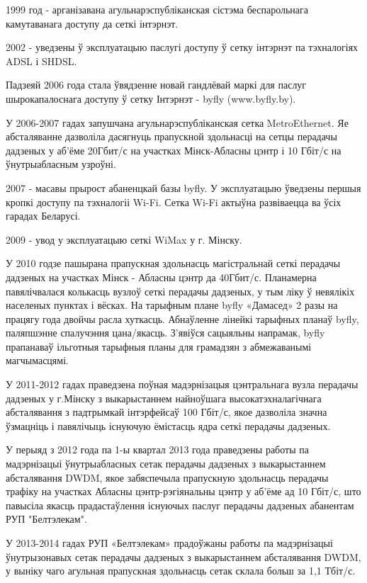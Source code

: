 1999 год - арганізавана агульнарэспубліканская сістэма беспарольнага камутаванага доступу да сеткі інтэрнэт.

2002 - уведзены ў эксплуатацыю паслугі доступу ў сетку інтэрнэт па тэхналогіях ADSL і SHDSL.

Падзеяй 2006 года стала ўвядзенне новай гандлёвай маркі для паслуг шырокапалоснага доступу ў сетку Інтэрнэт - byfly (www.byfly.by).

У 2006-2007 гадах запушчана агульнарэспубліканская сетка MetroEthernet. Яе абсталяванне дазволіла дасягнуць прапускной здольнасці на сетцы перадачы дадзеных у аб'ёме 20Гбит/с на участках Мінск-Абласны цэнтр і 10 Гбіт/с на ўнутрыабласным узроўні.

2007 - масавы прырост абаненцкай базы byfly. У эксплуатацыю ўведзены першыя кропкі доступу па тэхналогіі Wi-Fi. Сетка Wi-Fi актыўна развіваецца ва ўсіх гарадах Беларусі.

2009 - увод у эксплуатацыю сеткі WiMax у г. Мінску.

У 2010 годзе пашырана прапускная здольнасць магістральнай сеткі перадачы дадзеных на участках Мінск - Абласны цэнтр да 40Гбит/с. Планамерна павялічвалася колькасць вузлоў сеткі перадачы дадзеных, у тым ліку ў невялікіх населеных пунктах і вёсках. На тарыфным плане byfly «Дамасед» 2 разы на працягу года двойчы расла хуткасць. Абнаўленне лінейкі тарыфных планаў byfly, паляпшэнне спалучэння цана/якасць. З'явіўся сацыяльны напрамак, byfly прапанаваў ільготныя тарыфныя планы для грамадзян з абмежаванымі магчымасцямі.

У 2011-2012 гадах праведзена поўная мадэрнізацыя цэнтральнага вузла перадачы дадзеных у г.Мінску з выкарыстаннем найноўшага высокатэхналагічнага абсталявання з падтрымкай інтэрфейсаў 100 Гбіт/с, якое дазволіла значна ўзмацніць і павялічыць існуючую ёмістасць ядра сеткі перадачы дадзеных.

У перыяд з 2012 года па 1-ы квартал 2013 года праведзены работы па мадэрнізацыі ўнутрыабласных сетак перадачы дадзеных з выкарыстаннем абсталявання DWDM, якое забяспечыла прапускную здольнасць перадачы трафіку на участках Абласны цэнтр-рэгіянальны цэнтр у аб'ёме ад 10 Гбіт/с, што павысіла якасць прадастаўлення існуючых паслуг перадачы дадзеных абанентам РУП "Белтэлекам".

У 2013-2014 гадах РУП «Белтэлекам» прадоўжаны работы па мадэрнізацыі ўнутрызонавых сетак перадачы дадзеных з выкарыстаннем абсталявання DWDM, у выніку чаго агульная прапускная здольнасць сетак склала больш за 1,1 Тбіт/с.

